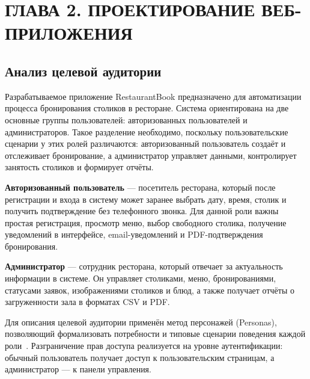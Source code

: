 
{}
\section*{ГЛАВА 2. ПРОЕКТИРОВАНИЕ ВЕБ-ПРИЛОЖЕНИЯ}

\subsection{Анализ целевой аудитории}
\label{subsec:audience}

Разрабатываемое приложение RestaurantBook предназначено для автоматизации
процесса бронирования столиков в ресторане. Система ориентирована на две
основные группы пользователей: авторизованных пользователей и администраторов.
Такое разделение необходимо, поскольку пользовательские сценарии у этих
ролей различаются: авторизованный пользователь создаёт и отслеживает бронирование, а
администратор управляет данными, контролирует занятость столиков и
формирует отчёты.

\textbf{Авторизованный пользователь} --- посетитель ресторана, который после регистрации и входа в систему может заранее выбрать
дату, время, столик и получить подтверждение без телефонного звонка. Для
данной роли важны простая регистрация, просмотр меню, выбор свободного
столика, получение уведомлений в интерфейсе, email-уведомлений и
PDF-подтверждения бронирования.

\textbf{Администратор} --- сотрудник ресторана, который отвечает за
актуальность информации в системе. Он управляет столиками, меню,
бронированиями, статусами заявок, изображениями столиков и блюд, а также
получает отчёты о загруженности зала в форматах CSV и PDF.

Для описания целевой аудитории применён метод персонажей (Personas),
позволяющий формализовать потребности и типовые сценарии поведения
каждой роли~\cite{cooper_personas}. Разграничение прав доступа
реализуется на уровне аутентификации: обычный пользователь получает
доступ к пользовательским страницам, а администратор --- к панели
управления.


